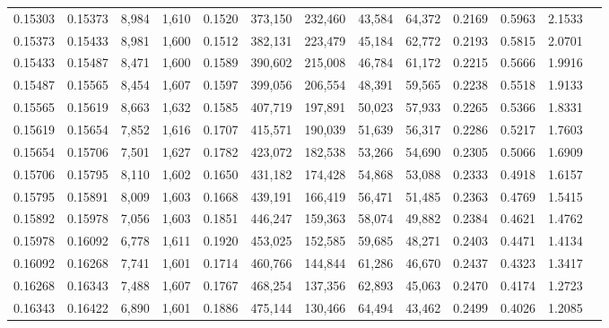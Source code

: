 \begin{tabular}{rrrrrrrrrrrrr}
0.15303 & 0.15373 &  8,984 & 1,610 &                                     0.1520 & 373,150 & 232,460 &  43,584 &  64,372 & 0.2169 & 0.5963 & 2.1533 \\
0.15373 & 0.15433 &  8,981 & 1,600 &                                     0.1512 & 382,131 & 223,479 &  45,184 &  62,772 & 0.2193 & 0.5815 & 2.0701 \\
0.15433 & 0.15487 &  8,471 & 1,600 &                                     0.1589 & 390,602 & 215,008 &  46,784 &  61,172 & 0.2215 & 0.5666 & 1.9916 \\
0.15487 & 0.15565 &  8,454 & 1,607 &                                     0.1597 & 399,056 & 206,554 &  48,391 &  59,565 & 0.2238 & 0.5518 & 1.9133 \\
0.15565 & 0.15619 &  8,663 & 1,632 &                                     0.1585 & 407,719 & 197,891 &  50,023 &  57,933 & 0.2265 & 0.5366 & 1.8331 \\
0.15619 & 0.15654 &  7,852 & 1,616 &                                     0.1707 & 415,571 & 190,039 &  51,639 &  56,317 & 0.2286 & 0.5217 & 1.7603 \\
0.15654 & 0.15706 &  7,501 & 1,627 &                                     0.1782 & 423,072 & 182,538 &  53,266 &  54,690 & 0.2305 & 0.5066 & 1.6909 \\
0.15706 & 0.15795 &  8,110 & 1,602 &                                     0.1650 & 431,182 & 174,428 &  54,868 &  53,088 & 0.2333 & 0.4918 & 1.6157 \\
0.15795 & 0.15891 &  8,009 & 1,603 &                                     0.1668 & 439,191 & 166,419 &  56,471 &  51,485 & 0.2363 & 0.4769 & 1.5415 \\
0.15892 & 0.15978 &  7,056 & 1,603 &                                     0.1851 & 446,247 & 159,363 &  58,074 &  49,882 & 0.2384 & 0.4621 & 1.4762 \\
0.15978 & 0.16092 &  6,778 & 1,611 &                                     0.1920 & 453,025 & 152,585 &  59,685 &  48,271 & 0.2403 & 0.4471 & 1.4134 \\
0.16092 & 0.16268 &  7,741 & 1,601 &                                     0.1714 & 460,766 & 144,844 &  61,286 &  46,670 & 0.2437 & 0.4323 & 1.3417 \\
0.16268 & 0.16343 &  7,488 & 1,607 &                                     0.1767 & 468,254 & 137,356 &  62,893 &  45,063 & 0.2470 & 0.4174 & 1.2723 \\
0.16343 & 0.16422 &  6,890 & 1,601 &                                     0.1886 & 475,144 & 130,466 &  64,494 &  43,462 & 0.2499 & 0.4026 & 1.2085 \\

\end{tabular}
